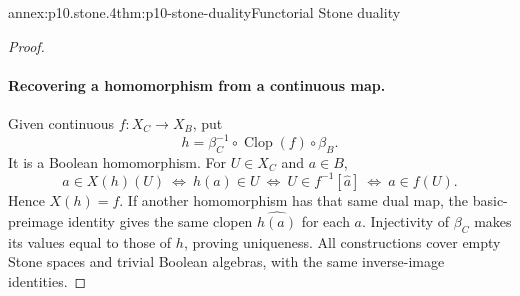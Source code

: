 \begin{annexitem}{annex:p10.stone.4}{thm:p10-stone-duality}{Functorial Stone duality}
\begin{proof}
\paragraph{Recovering a homomorphism from a continuous map.}
Given continuous \(f:X_C\to X_B\), put
\[
 h=\beta_C^{-1}\circ\operatorname{Clop}(f)\circ\beta_B.
\]
It is a Boolean homomorphism.
For \(U\in X_C\) and \(a\in B\),
\[
 a\in X(h)(U)
 \ \Longleftrightarrow\ h(a)\in U
 \ \Longleftrightarrow\ U\in f^{-1}[\widehat a]
 \ \Longleftrightarrow\ a\in f(U).
\]
Hence \(X(h)=f\).
If another homomorphism has that same dual map, the basic-preimage
identity gives the same clopen \(\widehat{h(a)}\) for each \(a\).
Injectivity of \(\beta_C\) makes its values equal to those of \(h\),
proving uniqueness.
All constructions cover empty Stone spaces and trivial Boolean
algebras, with the same inverse-image identities.
\end{proof}
\end{annexitem}
